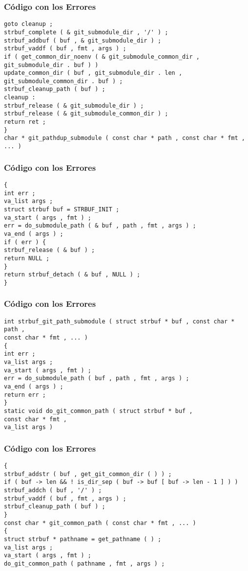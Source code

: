 \documentclass{beamer}
\begin{document}
\begin{frame}[fragile]
\frametitle{C\'odigo con los Errores}
\begin{verbatim}
goto cleanup ; 
strbuf_complete ( & git_submodule_dir , '/' ) ; 
strbuf_addbuf ( buf , & git_submodule_dir ) ; 
strbuf_vaddf ( buf , fmt , args ) ; 
if ( get_common_dir_noenv ( & git_submodule_common_dir , git_submodule_dir . buf ) ) 
update_common_dir ( buf , git_submodule_dir . len , git_submodule_common_dir . buf ) ; 
strbuf_cleanup_path ( buf ) ; 
cleanup : 
strbuf_release ( & git_submodule_dir ) ; 
strbuf_release ( & git_submodule_common_dir ) ; 
return ret ; 
} 
char * git_pathdup_submodule ( const char * path , const char * fmt , ... ) 
\end{verbatim}
\end{frame}
\begin{frame}[fragile]
\frametitle{C\'odigo con los Errores}
\begin{verbatim}
{ 
int err ; 
va_list args ; 
struct strbuf buf = STRBUF_INIT ; 
va_start ( args , fmt ) ; 
err = do_submodule_path ( & buf , path , fmt , args ) ; 
va_end ( args ) ; 
if ( err ) { 
strbuf_release ( & buf ) ; 
return NULL ; 
} 
return strbuf_detach ( & buf , NULL ) ; 
} 
\end{verbatim}
\end{frame}
\begin{frame}[fragile]
\frametitle{C\'odigo con los Errores}
\begin{verbatim}
int strbuf_git_path_submodule ( struct strbuf * buf , const char * path , 
const char * fmt , ... ) 
{ 
int err ; 
va_list args ; 
va_start ( args , fmt ) ; 
err = do_submodule_path ( buf , path , fmt , args ) ; 
va_end ( args ) ; 
return err ; 
} 
static void do_git_common_path ( struct strbuf * buf , 
const char * fmt , 
va_list args ) 
\end{verbatim}
\end{frame}
\begin{frame}[fragile]
\frametitle{C\'odigo con los Errores}
\begin{verbatim}
{ 
strbuf_addstr ( buf , get_git_common_dir ( ) ) ; 
if ( buf -> len && ! is_dir_sep ( buf -> buf [ buf -> len - 1 ] ) ) 
strbuf_addch ( buf , '/' ) ; 
strbuf_vaddf ( buf , fmt , args ) ; 
strbuf_cleanup_path ( buf ) ; 
} 
const char * git_common_path ( const char * fmt , ... ) 
{ 
struct strbuf * pathname = get_pathname ( ) ; 
va_list args ; 
va_start ( args , fmt ) ; 
do_git_common_path ( pathname , fmt , args ) ; 
\end{verbatim}
\end{frame}
\end{document}
